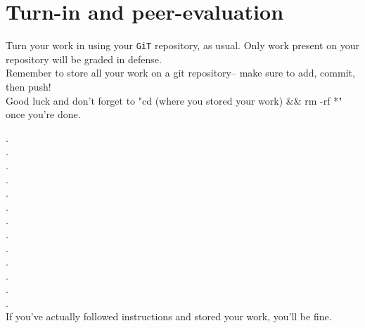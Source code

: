\documentclass{42-en}
\begin{document}
\chapter{Turn-in and peer-evaluation}
    Turn your work in using your \texttt{GiT} repository, as
    usual. Only work present on your repository will be graded in defense. \\
	
	Remember to store all your work on a git repository-- make sure to add, commit, then push! \\ 

    Good luck and don't forget to "cd (where you stored your work) \&\& rm -rf *" once you're done.

    . \\

    . \\

    . \\ 

    . \\ 

    . \\ 

    . \\

    . \\

    . \\

    . \\
    
    . \\

    . \\
    
    . \\

    . \\

    If you've actually followed instructions and stored your work, you'll be fine.

\end{document}
